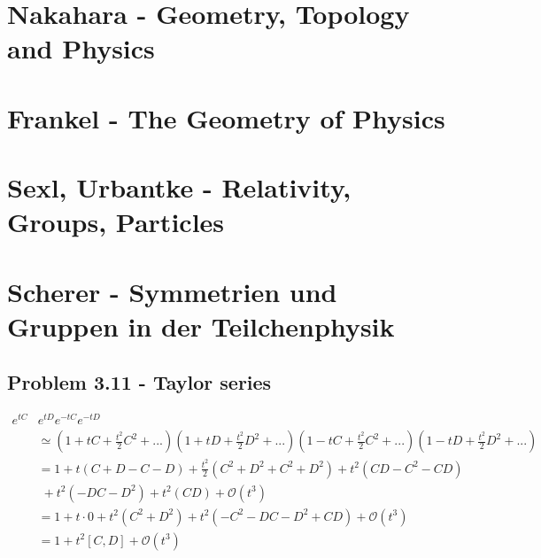 \documentclass[../main.tex]{subfiles}
\begin{document}
\section{{\sc Nakahara} - Geometry, Topology and Physics}

\section{{\sc Frankel} - The Geometry of Physics}

\section{{\sc Sexl, Urbantke} - Relativity, Groups, Particles}

\section{{\sc Scherer} - Symmetrien und Gruppen in der Teilchenphysik}
\subsection{Problem 3.11 - Taylor series}
\begin{align}
e^{tC}&e^{tD}e^{-tC}e^{-tD}\\
&\simeq\left(1+tC+\frac{t^2}{2}C^2+...\right)\left(1+tD+\frac{t^2}{2}D^2+...\right)\left(1-tC+\frac{t^2}{2}C^2+...\right)\left(1-tD+\frac{t^2}{2}D^2+...\right)\\
&=1+t(C+D-C-D)+\frac{t^2}{2}(C^2+D^2+C^2+D^2)+t^2(CD-C^2-CD)\\
&\;+t^2(-DC-D^2)+t^2(CD)+\mathcal{O}(t^3)\\
&=1+t\cdot 0+t^2(C^2+D^2)+t^2(-C^2-DC-D^2+CD)+\mathcal{O}(t^3)\\
&=1+t^2[C,D]+\mathcal{O}(t^3)\\
\end{align}
\end{document}
